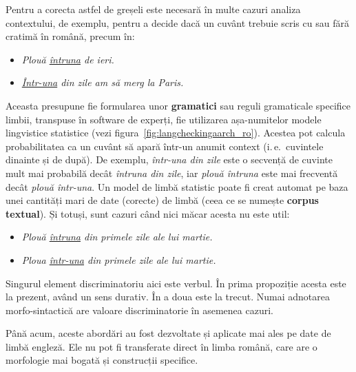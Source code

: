 \begin{multicols}{2}
Pentru a corecta astfel de greșeli este necesară în multe cazuri analiza contextului, de exemplu, pentru a decide dacă un cuvânt trebuie scris cu sau fără cratimă în română, precum în:

\begin{itemize}
\item \textit{Plouă \underline{întruna} de ieri.}
\item \textit{\underline{Într-una} din zile am să merg la Paris.}
\end{itemize}

Aceasta presupune fie formularea unor \textbf{gramatici} sau reguli gramaticale specifice limbii, transpuse în software de experți, fie utilizarea așa-numitelor modele lingvistice statistice (vezi figura~\ref{fig:langcheckingaarch_ro}). Acestea pot calcula probabilitatea ca un cuvânt să apară \mbox{într-un} anumit context (i.\,e.~cuvintele dinainte și de după). De exemplu, \textit{într-una din zile} este o secvență de cuvinte mult mai probabilă decât \textit{întruna din zile}, iar \textit{plouă întruna} este mai frecventă decât \textit{plouă într-una}. Un model de limbă statistic poate fi creat automat pe baza unei cantități mari de date (corecte) de limbă (ceea ce se numește \textbf{corpus textual}). Și totuși, sunt cazuri când nici măcar acesta nu este util:

\begin{itemize}
\item \textit{Plouă \underline{întruna} din primele zile ale lui martie.}
\item \textit{Ploua \underline{într-una} din primele zile ale lui martie.}
\end{itemize}

Singurul element discriminatoriu aici este verbul. În prima propoziție acesta este la prezent, având un sens durativ. În a doua este la trecut. Numai adnotarea morfo-sintactică are valoare discriminatorie în asemenea cazuri.

Până acum, aceste abordări au fost dezvoltate și aplicate mai ales pe date de limbă engleză. Ele nu pot fi transferate direct în limba română, care are o morfologie mai bogată și construcții specifice.



\end{multicols}
